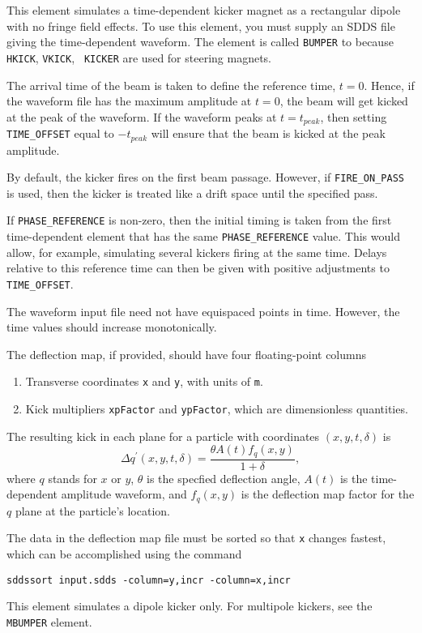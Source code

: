 This element simulates a time-dependent kicker magnet as a rectangular
dipole with no fringe field effects.  To use this element, you must
supply an SDDS file giving the time-dependent waveform.  The element
is called {\tt BUMPER} to because {\tt HKICK}, {\tt VKICK}, {\tt
KICKER} are used for steering magnets.

The arrival time of the beam is taken to define the reference time,
$t=0$.  Hence, if the waveform file has the maximum amplitude at
$t=0$, the beam will get kicked at the peak of the waveform.  If the waveform
peaks at $t=t_{peak}$, then setting \verb|TIME_OFFSET| equal to $-t_{peak}$
will ensure that the beam is kicked at the peak amplitude.

By default, the kicker fires on the first beam passage.  However, if 
\verb|FIRE_ON_PASS| is used, then the kicker is treated like a drift space until
the specified pass.

If \verb|PHASE_REFERENCE| is non-zero, then the initial timing is
taken from the first time-dependent element that has the same
\verb|PHASE_REFERENCE| value.  This would allow, for example,
simulating several kickers firing at the same time.  Delays relative
to this reference time can then be given with positive adjustments to
\verb|TIME_OFFSET|.

The waveform input file need not have equispaced points in time.  However, the
time values should increase monotonically.

The deflection map, if provided, should have four floating-point columns
\begin{enumerate}
\item Transverse coordinates \verb|x| and \verb|y|, with units of \verb|m|.
\item Kick multipliers \verb|xpFactor| and \verb|ypFactor|, which are dimensionless quantities.
\end{enumerate}
The resulting kick in each plane for a particle with coordinates $(x, y, t, \delta)$ is 
\begin{equation}
\Delta q^\prime (x, y, t, \delta) = \frac{\theta A(t) f_q(x, y)}{1 + \delta},
\end{equation}
where $q$ stands for $x$ or $y$, $\theta$ is the specfied deflection angle, 
$A(t)$ is the time-dependent amplitude waveform, and $f_q(x, y)$ is the
deflection map factor for the $q$ plane at the particle's location.

The data in the deflection map file must be sorted so that \verb|x| changes fastest, which can be accomplished using
the command
\begin{verbatim}
sddssort input.sdds -column=y,incr -column=x,incr 
\end{verbatim}

This element simulates a dipole kicker only.  For multipole kickers, see the
{\tt MBUMPER} element.